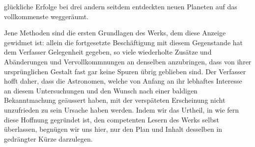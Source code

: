 glückliche Erfolge bei drei andern seitdem entdeckten neuen Planeten auf das vollkommenste weggeräumt.

Jene Methoden sind die ersten Grundlagen des Werks, dem diese Anzeige gewidmet ist: allein die fortgesetzte Beschäftigung mit diesem Gegenstande hat dem Verfasser Gelegenheit gegeben, so viele wiederholte Zusätze und Abänderungen und Vervollkommnungen an denselben anzubringen, dass von ihrer ursprünglichen Gestalt fast gar keine Spuren übrig geblieben sind. Der Verfasser hofft daher, dass die Astronomen, welche von Anfang an ihr lebhaftes Interesse an diesem Untersuchungen und den Wunsch nach einer baldigen Bekanntmachung geäussert haben, mit der verspäteten Erscheinung nicht unzufrieden zu sein Ursache haben werden. Indem wir das Urtheil, in wie fern diese Hoffnung gegründet ist, den competenten Lesern des Werks selbst überlassen, begnügen wir uns hier, nur den Plan und Inhalt desselben in gedrängter Kürze darzulegen.

